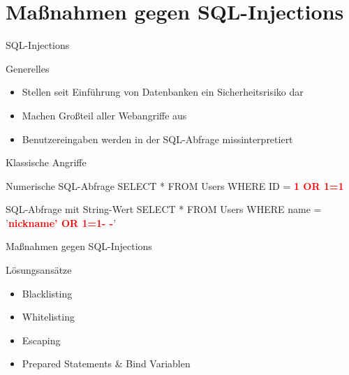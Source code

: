 \section{Maßnahmen gegen SQL-Injections}

\begin{frame}{SQL-Injections}
\begin{block}{Generelles}
\begin{itemize}[<+->]
	\item Stellen seit Einführung von Datenbanken ein Sicherheitsrisiko dar
	\item Machen Großteil aller Webangriffe aus
	\item Benutzereingaben werden in der SQL-Abfrage missinterpretiert
\end{itemize}
\end{block}
\end{frame}

\begin{frame}{Klassische Angriffe}
\begin{block}{Numerische SQL-Abfrage}
	SELECT * FROM Users WHERE ID = \textcolor{red}{\textbf{1 OR 1=1}}
\end{block}
\begin{block}{SQL-Abfrage mit String-Wert}
	SELECT * FROM Users WHERE name = '{}\textcolor{red}{\textbf{nickname'{} OR 1=1- -}}'{}
\end{block}
\end{frame}


\begin{frame}{Maßnahmen gegen SQL-Injections}
\begin{block}{Lösungsansätze}
\begin{itemize}[<+->]
\item Blacklisting 
\item Whitelisting
\item Escaping
\item Prepared Statements \& Bind Variablen
\end{itemize}
\end{block}
\end{frame}

